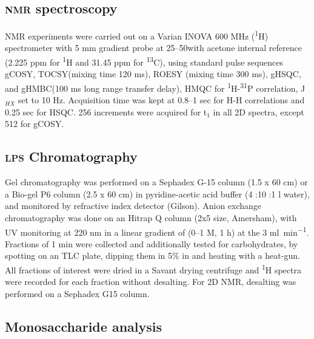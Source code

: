 	\subsection{\textsc{nmr} spectroscopy} %
	\label{sub:nmr_spectroscopy}

		\ac{NMR} experiments were carried out on a Varian INOVA 600 \si{\mega\hertz} (\textsuperscript{1}H) spectrometer with 5 \si{\milli\meter} gradient probe at 25--50\cel with acetone internal reference (2.225 ppm for \textsuperscript{1}H and 31.45 ppm for \textsuperscript{13}C), using standard pulse sequences \ac{gCOSY}, \ac{TOCSY}(mixing time 120 \si{\milli\second}), \ac{ROESY} (mixing time 300 \si{\milli\second}),  \ac{gHSQC}, and \ac{gHMBC}(100 \si{\milli\second} long range transfer delay), \ac{HMQC} for \textsuperscript{1}H-\textsuperscript{31}P correlation, J$_{HX}$ set to 10 \si{\hertz}. Acquisition time was kept at 0.8--1 sec for H-H correlations and 0.25 sec for \ac{HSQC}. 256 increments were acquired for t$_1$ in all 2D spectra, except 512 for \ac{gCOSY}.

	\subsection{\textsc{lps} Chromatography} %
	\label{sub:chromatography}

		Gel chromatography was performed on a Sephadex G-15 column (1.5 x 60 \si{\centi\meter}) or a Bio-gel P6 column (2.5 x 60 \si{\centi\meter}) in pyridine-acetic acid buffer (4 \millilitre:10 \millilitre:1 \si{\litre} water), and monitored by refractive index detector (Gilson). Anion exchange chromatography was done on an Hitrap Q column (2x5 \millilitre size, Amersham), with \ac{UV} monitoring at 220 nm in a linear gradient of  (0--1 M, 1 h) at the 3 \si{\milli\litre\per\minute}. Fractions of 1 min were collected and additionally tested for carbohydrates, by spotting on an  \ac{TLC} plate, dipping them in 5\%  in  and heating with a heat-gun. All fractions of interest were dried in a Savant drying centrifuge and \textsuperscript{1}H spectra were recorded for each fraction without desalting. For 2D \ac{NMR}, desalting was performed on a Sephadex G15 column. 

	\subsection{Monosaccharide analysis} %
	\label{sub:monosaccharide_analysis}

